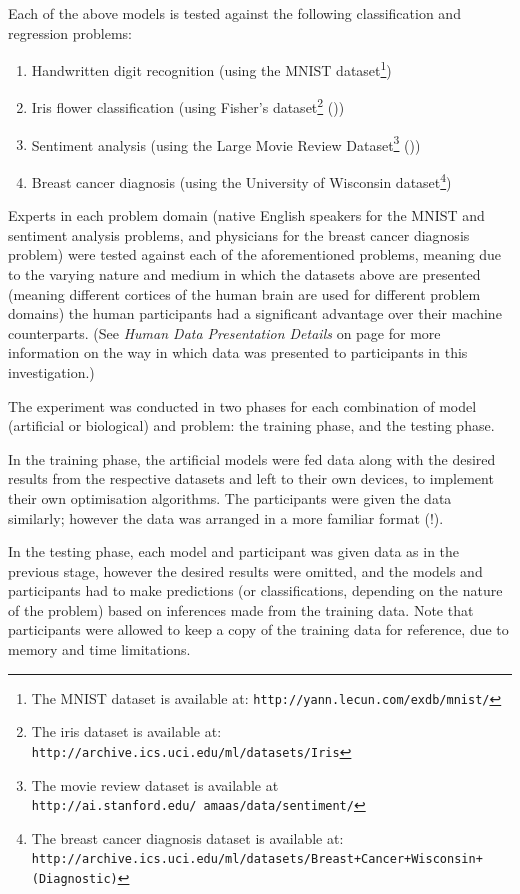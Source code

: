 \documentclass[]{report}
\begin{document}
Each of the above models is tested against the following classification and regression problems:

\begin{enumerate}
	\item Handwritten digit recognition (using the MNIST dataset\footnote{The MNIST dataset is available at: \texttt{http://yann.lecun.com/exdb/mnist/}})
	\item Iris flower classification (using Fisher's dataset\footnote{The iris dataset is available at: \texttt{http://archive.ics.uci.edu/ml/datasets/Iris}} (\cite{uciml2007}))
	\item Sentiment analysis (using the Large Movie Review Dataset\footnote{The movie review dataset is available at \texttt{http://ai.stanford.edu/~amaas/data/sentiment/}} (\cite{maas2011imdb}))
	\item Breast cancer diagnosis (using the University of Wisconsin dataset\footnote{The breast cancer diagnosis dataset is available at: \texttt{http://archive.ics.uci.edu/ml/datasets/Breast+Cancer+Wisconsin+(Diagnostic)}})
\end{enumerate}

Experts in each problem domain (native English speakers for the MNIST and sentiment analysis problems, and physicians for the breast cancer diagnosis problem) were tested against each of the aforementioned problems, meaning due to the varying nature and medium in which the datasets above are presented (meaning different cortices of the human brain are used for different problem domains) the human participants had a significant advantage over their machine counterparts. (See \emph{Human Data Presentation Details} on page \pageref{sec:Appendix_II} for more information on the way in which data was presented to participants in this investigation.)

The experiment was conducted in two phases for each combination of model (artificial or biological) and problem: the training phase, and the testing phase.

In the training phase, the artificial models were fed data along with the desired results from the respective datasets and left to their own devices, to implement their own optimisation algorithms. The participants were given the data similarly; however the data was arranged in a more familiar format (!).

In the testing phase, each model and participant was given data as in the previous stage, however the desired results were omitted, and the models and participants had to make predictions (or classifications, depending on the nature of the problem) based on inferences made from the training data. Note that participants were allowed to keep a copy of the training data for reference, due to memory and time limitations.
\end{document}
